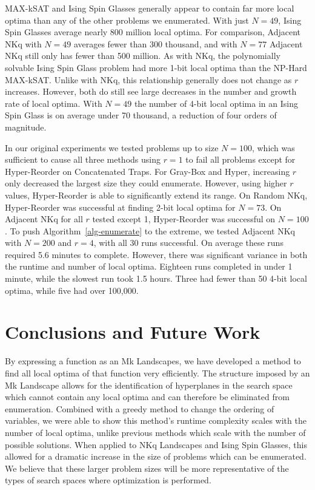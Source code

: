 \documentclass[runningheads,a4paper]{llncs}
\begin{document}
MAX-kSAT and Ising Spin Glasses generally appear to contain far more local optima than
any of the other problems we enumerated. With just $N=49$, Ising Spin Glasses average
nearly 800 million local optima. For comparison, Adjacent NKq with $N=49$ averages fewer than 300 thousand,
and with $N=77$ Adjacent NKq still only has fewer than 500 million.
As with NKq, the polynomially solvable Ising Spin
Glass problem had more 1-bit local optima than the NP-Hard MAX-kSAT. Unlike with NKq, this
relationship generally does not change as $r$ increases. However, both do still
see large decreases in the number and growth rate of local optima. With $N=49$
the number of 4-bit local optima in an Ising Spin Glass is on average under 70 thousand,
a reduction of four orders of magnitude.

In our original experiments we tested problems up to size $N=100$, which was sufficient to
cause all three methods using $r=1$ to fail all problems except for Hyper-Reorder on Concatenated
Traps. For Gray-Box and Hyper, increasing $r$ only decreased the largest size they could
enumerate.
However, using higher $r$ values, Hyper-Reorder is able to significantly extend its range.
On Random NKq, Hyper-Reorder was successful at finding 2-bit local optima for $N=73$. On Adjacent
NKq for all $r$ tested except 1, Hyper-Reorder was successful on $N=100$. To push Algorithm~\ref{alg-enumerate}
to the extreme, we tested Adjacent NKq with $N=200$ and $r=4$, with all 30 runs successful. On
average these runs required 5.6 minutes to complete. However, there was significant variance
in both the runtime and number of local optima. Eighteen runs completed in under 1 minute,
while the slowest run took 1.5 hours. Three had fewer than 50 4-bit local optima, while five
had over 100,000.


\section{Conclusions and Future Work}
By expressing a function as an Mk Landscapes, we have developed a method to find all
local optima of that function very efficiently. The structure imposed by
an Mk Landscape allows for the identification of hyperplanes in the search space
which cannot contain any local optima and can therefore be eliminated from enumeration.
Combined with a greedy method to
change the ordering of variables, we were able to show
this method's runtime complexity scales with the number of local optima, unlike
previous methods which scale with the number of possible solutions.
When applied to NKq Landscapes and Ising Spin Glasses, this allowed for a dramatic
increase in the size of problems which can be enumerated. We believe that
these larger problem sizes will be more representative of the types
of search spaces where optimization is performed.
\end{document}
